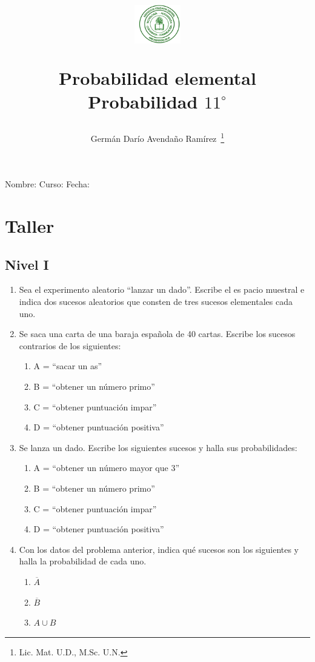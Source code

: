 \documentclass[10pt,twoside]{article}
\author{Germ\'an Dar\'io Avenda\~no Ram\'irez~\thanks{Lic. Mat. U.D., M.Sc. U.N.}}
\title{\begin{minipage}{0.15\textwidth}\includegraphics[height=1.7cm]{Images/logo-colegio.png}
\end{minipage}\hfill \begin{minipage}{0.85\textwidth}\begin{center}
Probabilidad elemental\\Probabilidad $11^{\circ}$\end{center}
\end{minipage}}
\date{}
\begin{document}
\maketitle
Nombre: \hrulefill Curso: \underline{\hspace{1cm}}  Fecha: \underline{\hspace{2cm}}\\
\section{Taller}
\subsection{Nivel I}
\begin{enumerate}
  \item Sea el experimento aleatorio “lanzar un dado”. Escribe el es pacio muestral e indica dos sucesos aleatorios que consten
de tres sucesos elementales cada uno.
\item Se saca una carta de una baraja española de 40 cartas. Escribe los sucesos contrarios de los siguientes:
\begin{enumerate}
  \item A = “sacar un as”
  \item B = “obtener un número primo”
  \item C = “obtener puntuación impar”
  \item D = “obtener puntuación positiva”
\end{enumerate}
\item Se lanza un dado. Escribe los siguientes sucesos y halla sus probabilidades:
\begin{enumerate}
  \item A = “obtener un número mayor que 3”
  \item B = “obtener un número primo”
  \item C = “obtener puntuación impar”
  \item D = “obtener puntuación positiva”
\end{enumerate}
\item Con los datos del problema anterior, indica qué sucesos son
los siguientes y halla la probabilidad de cada uno.
\begin{multicols}{3}
  \begin{enumerate}
    \item $ \overline{A} $
    \item $ \overline{B} $
    \item $ A\cup B $

\end{enumerate}
\end{multicols}
\end{enumerate}
\end{document}
